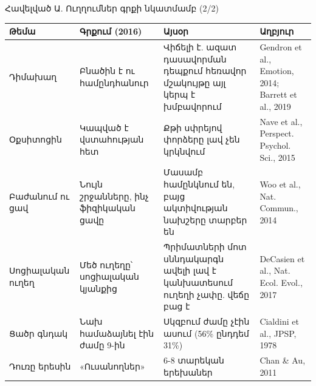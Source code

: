 \begin{frame}{Հավելված Ա. Ուղղումներ գրքի նկատմամբ (2/2)}
  \scriptsize
  \setlength{\tabcolsep}{4pt}
  \renewcommand{\arraystretch}{1.3}
  \begin{tabular}{@{}L{2.3cm}L{3.3cm}L{4.6cm}L{3.3cm}@{}}
    \toprule
    \textbf{Թեմա} & \textbf{Գրքում (2016)} & \textbf{Այսօր} & \textbf{Աղբյուր}\\
    \midrule
    Դիմախաղ & Բնածին է ու համընդհանուր & Վիճելի է. ազատ դասավորման դեպքում հեռավոր մշակույթը այլ կերպ է խմբավորում & Gendron et al., Emotion, 2014; Barrett et al., 2019\\
    Օքսիտոցին & Կապված է վստահության հետ & Քթի սփրեյով փորձերը լավ չեն կրկնվում & Nave et al., Perspect. Psychol. Sci., 2015\\
    Բաժանում ու ցավ & Նույն շրջանները, ինչ ֆիզիկական ցավը & Մասամբ համընկնում են, բայց ակտիվության նախշերը տարբեր են & Woo et al., Nat. Commun., 2014\\
    Սոցիալական ուղեղ & Մեծ ուղեղը՝ սոցիալական կյանքից & Պրիմատների մոտ սննդակարգն ավելի լավ է կանխատեսում ուղեղի չափը. վեճը բաց է & DeCasien et al., Nat. Ecol. Evol., 2017\\
    Ցածր գնդակ & Նախ համաձայնել էին ժամը 9-ին & Սկզբում ժամը չէին ասում (56\% ընդդեմ 31\%) & Cialdini et al., JPSP, 1978\\
    Դուռը երեսին & «Ուսանողներ» & 6-8 տարեկան երեխաներ & Chan \& Au, 2011\\
    \bottomrule
  \end{tabular}
\end{frame}

